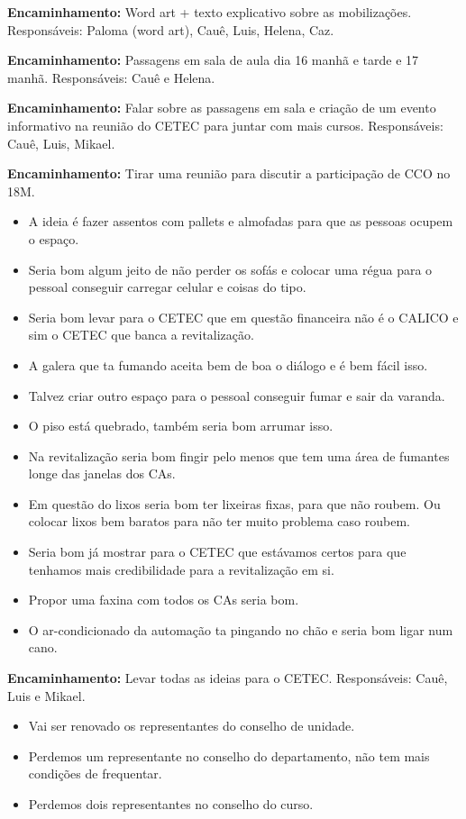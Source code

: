 \documentclass{ata-calico}
\begin{document}
\textbf{Encaminhamento:} Word art + texto explicativo sobre as mobilizações. Responsáveis: Paloma (word art), Cauê, Luis, Helena, Caz.

\textbf{Encaminhamento:} Passagens em sala de aula dia 16 manhã e tarde e 17 manhã. Responsáveis: Cauê e Helena.

\textbf{Encaminhamento:} Falar sobre as passagens em sala e criação de um evento informativo na reunião do CETEC para juntar com mais cursos. Responsáveis: Cauê, Luis, Mikael.

\textbf{Encaminhamento:} Tirar uma reunião para discutir a participação de CCO no 18M.

\begin{itemize}
\item A ideia é fazer assentos com pallets e almofadas para que as pessoas ocupem o espaço.
\item Seria bom algum jeito de não perder os sofás e colocar uma régua para o pessoal conseguir carregar celular e coisas do tipo.
\item Seria bom levar para o CETEC que em questão financeira não é o CALICO e sim o CETEC que banca a revitalização.
\item A galera que ta fumando aceita bem de boa o diálogo e é bem fácil isso.
\item Talvez criar outro espaço para o pessoal conseguir fumar e sair da varanda.
\item O piso está quebrado, também seria bom arrumar isso.
\item Na revitalização seria bom fingir pelo menos que tem uma área de fumantes longe das janelas dos CAs.
\item Em questão do lixos seria bom ter lixeiras fixas, para que não roubem. Ou colocar lixos bem baratos para não ter muito problema caso roubem.
\item Seria bom já mostrar para o CETEC que estávamos certos para que tenhamos mais credibilidade para a revitalização em si.
\item Propor uma faxina com todos os CAs seria bom.
\item O ar-condicionado da automação ta pingando no chão e seria bom ligar num cano.
\end{itemize}

\textbf{Encaminhamento:} Levar todas as ideias para o CETEC. Responsáveis: Cauê, Luis e Mikael.

\begin{itemize}
\item Vai ser renovado os representantes do conselho de unidade.
\item Perdemos um representante no conselho do departamento, não tem mais condições de frequentar.
\item Perdemos dois representantes no conselho do curso.
\end{itemize}
\end{document}
